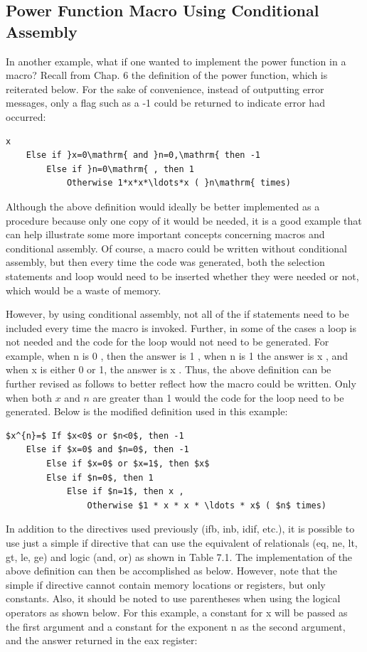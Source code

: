 \documentclass[10pt]{book}
\begin{document}
\subsection{Power Function Macro Using Conditional Assembly}
In another example, what if one wanted to implement the power function in a macro? Recall from Chap. 6 the definition of the power function, which is reiterated below. For the sake of convenience, instead of outputting error messages, only a flag such as a -1 could be returned to indicate error had occurred:

\begin{verbatim}
x
    Else if }x=0\mathrm{ and }n=0,\mathrm{ then -1
        Else if }n=0\mathrm{ , then 1
            Otherwise 1*x*x*\ldots*x ( }n\mathrm{ times)
\end{verbatim}

Although the above definition would ideally be better implemented as a procedure because only one copy of it would be needed, it is a good example that can help illustrate some more important concepts concerning macros and conditional assembly. Of course, a macro could be written without conditional assembly, but then every time the code was generated, both the selection statements and loop would need to be inserted whether they were needed or not, which would be a waste of memory.

However, by using conditional assembly, not all of the if statements need to be included every time the macro is invoked. Further, in some of the cases a loop is not needed and the code for the loop would not need to be generated. For example, when n is 0 , then the answer is 1 , when n is 1 the answer is x , and when x is either 0 or 1, the answer is x . Thus, the above definition can be further revised as follows to better reflect how the macro could be written. Only when both $x$ and $n$ are greater than 1 would the code for the loop need to be generated. Below is the modified definition used in this example:

\begin{verbatim}
$x^{n}=$ If $x<0$ or $n<0$, then -1
    Else if $x=0$ and $n=0$, then -1
        Else if $x=0$ or $x=1$, then $x$
        Else if $n=0$, then 1
            Else if $n=1$, then x ,
                Otherwise $1 * x * x * \ldots * x$ ( $n$ times)
\end{verbatim}

In addition to the directives used previously (ifb, inb, idif, etc.), it is possible to use just a simple if directive that can use the equivalent of relationals (eq, ne, lt, gt, le, ge) and logic (and, or) as shown in Table 7.1. The implementation of the above definition can then be accomplished as below. However, note that the simple if directive cannot contain memory locations or registers, but only constants. Also, it should be noted to use parentheses when using the logical operators as shown below. For this example, a constant for x will be passed as the first argument and a constant for the exponent n as the second argument, and the answer returned in the eax register:
\end{document}
